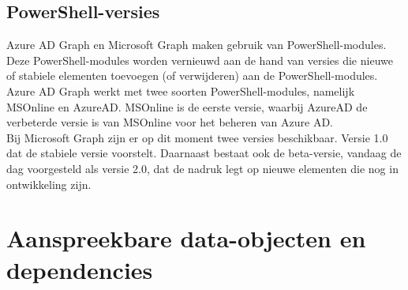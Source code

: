 







\subsection{PowerShell-versies}


Azure \ac{AD} Graph en Microsoft Graph maken gebruik van PowerShell-modules. Deze PowerShell-modules worden vernieuwd aan de hand van versies die nieuwe of stabiele elementen toevoegen (of verwijderen) aan de PowerShell-modules. \\

Azure \ac{AD} Graph werkt met twee soorten PowerShell-modules, namelijk MSOnline en AzureAD. MSOnline is de eerste versie, waarbij AzureAD de verbeterde versie is van MSOnline voor het beheren van Azure \ac{AD}. \\

Bij Microsoft Graph zijn er op dit moment twee versies beschikbaar. Versie 1.0 dat de stabiele versie voorstelt. Daarnaast bestaat ook de beta-versie, vandaag de dag voorgesteld als versie 2.0, dat de nadruk legt op nieuwe elementen die nog in ontwikkeling zijn. \\ 


\section{Aanspreekbare data-objecten en dependencies}

